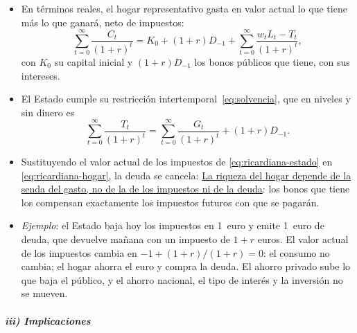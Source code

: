 \documentclass[11pt]{article}
\begin{document}
\begin{itemize}
\item En términos reales, el hogar representativo gasta en valor actual lo que tiene más lo que ganará, neto de impuestos\nocite{Romer2019Advanced}:
  \begin{equation}\label{eq:ricardiana-hogar}
  \sum_{t=0}^{\infty}\frac{C_t}{(1+r)^t}=K_0+(1+r)D_{-1}+\sum_{t=0}^{\infty}\frac{w_tL_t-T_t}{(1+r)^t},
  \end{equation}
  con $K_0$ su capital inicial y $(1+r)D_{-1}$ los bonos públicos que tiene, con sus intereses.
\item El Estado cumple su restricción intertemporal~\eqref{eq:solvencia}, que en niveles y sin dinero es
  \begin{equation}\label{eq:ricardiana-estado}
  \sum_{t=0}^{\infty}\frac{T_t}{(1+r)^t}=\sum_{t=0}^{\infty}\frac{G_t}{(1+r)^t}+(1+r)D_{-1}.
  \end{equation}
\item Sustituyendo el valor actual de los impuestos de \eqref{eq:ricardiana-estado} en \eqref{eq:ricardiana-hogar}, la deuda se cancela:
  \uline{La riqueza del hogar depende de la senda del gasto, no de la de los impuestos ni de la deuda}: los bonos que tiene los compensan exactamente los impuestos futuros con que se pagarán.
\item \emph{Ejemplo}: el Estado baja hoy los impuestos en 1~euro y emite 1~euro de deuda, que devuelve mañana con un impuesto de $1+r$ euros. El valor actual de los impuestos cambia en $-1+(1+r)/(1+r)=0$: el consumo no cambia; el hogar ahorra el euro y compra la deuda. El ahorro privado sube lo que baja el público, y el ahorro nacional, el tipo de interés y la inversión no se mueven.
\end{itemize}

\subparagraph{iii) Implicaciones}
\end{document}
